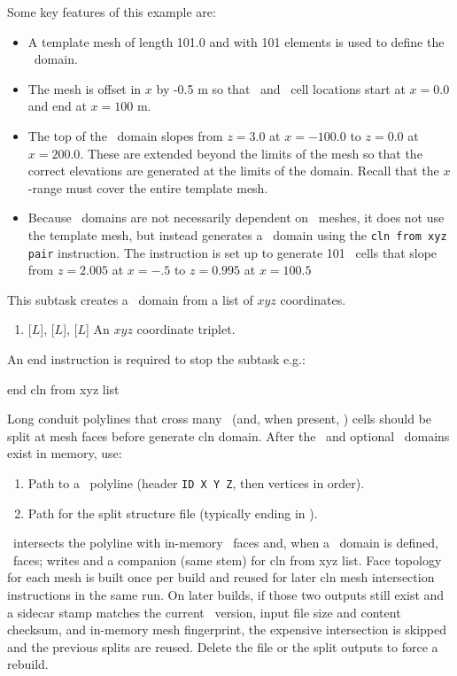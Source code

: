 Some key features of this example are:
\begin{itemize}
    \item A template mesh of length 101.0 and with 101 elements is used to define the \gwf\ domain.
    \item The mesh is offset in $x$ by -0.5 m so that \gwf\ and \cln\ cell locations start at $x=0.0$ and end at $x=100$ m.
    \item The top of the \gwf\ domain slopes from $z=3.0$ at $x=-100.0$ to $z=0.0$ at $x=200.0$.  These are extended beyond the limits of the mesh so that the correct elevations are generated at the limits of the domain. Recall that the $x$-range must cover the entire template mesh.
    \item Because \cln\ domains are not necessarily dependent on \gwf\ meshes, it does not use the template mesh, but instead generates a \cln\ domain using the  \texttt{cln from xyz pair} instruction.  The instruction is set up to generate 101 \cln\ cells that slope from $z=2.005$ at $x=-.5$ to $z=0.995$ at $x=100.5$
\end{itemize}

    {This subtask creates a \cln\ domain from a list of $xyz$ coordinates.
    \begin{enumerate}
        \item {} [$L$],  [$L$],  [$L$]  An $xyz$ coordinate triplet.
    \end{enumerate}

    An end instruction is required to stop the subtask e.g.:

    {\Large \sf end cln from xyz list}
    }

Long conduit polylines that cross many \gwf\ (and, when present, \swf) cells should be split at mesh faces before {\sf generate cln domain}.  After the \gwf\ and optional \swf\ domains exist in memory, use:

    {
        \squish
        \begin{enumerate}
        \item {}  Path to a \cln\ polyline  (header {\tt ID X Y Z}, then vertices in order).
        \item {}  Path for the split structure file (typically ending in ).
        \end{enumerate}
        \mut\ intersects the polyline with in-memory \gwf\ faces and, when a \swf\ domain is defined, \swf\ faces; writes  and a companion  (same stem) for {\sf cln from xyz list}.
        Face topology for each mesh is built once per build and reused for later {\sf cln mesh intersection} instructions in the same run.
        On later builds, if those two outputs still exist and a sidecar  stamp matches the current \mut\ version, input file size and content checksum, and in-memory mesh fingerprint, the expensive intersection is skipped and the previous splits are reused.  Delete the  file or the split outputs to force a rebuild.
    }

